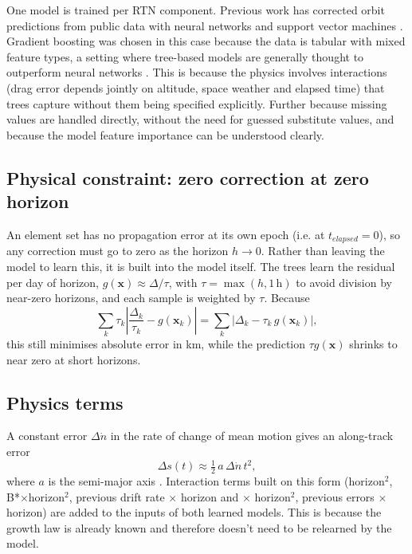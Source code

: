 \documentclass[11pt, a4paper]{article}
\begin{document}
One model is trained per RTN component. Previous work has corrected orbit predictions from public data with neural networks and support vector machines \cite{peng2018ann,peng2020}. Gradient boosting was chosen in this case because the data is tabular with mixed feature types, a setting where tree-based models are generally thought to outperform neural networks \cite{grinsztajn2022}. This is because the physics involves interactions (drag error depends jointly on altitude, space weather and elapsed time) that trees capture without them being specified explicitly. Further because missing values are handled directly, without the need for guessed substitute values, and because the model feature importance can be understood clearly.

\subsection{Physical constraint: zero correction at zero horizon}

An element set has no propagation error at its own epoch (i.e. at $t_{elapsed}=0$), so any correction must go to zero as the horizon $h \to 0$. Rather than leaving the model to learn this, it is built into the model itself. The trees learn the residual per day of horizon, $g(\mathbf{x}) \approx \Delta/\tau$, with $\tau = \max(h, 1\,\text{h})$ to avoid division by near-zero horizons, and each sample is weighted by $\tau$. Because
\begin{equation}
\sum_k \tau_k \left| \frac{\Delta_k}{\tau_k} - g(\mathbf{x}_k) \right| = \sum_k \left| \Delta_k - \tau_k\, g(\mathbf{x}_k) \right|,
\end{equation}
this still minimises absolute error in km, while the prediction $\tau g(\mathbf{x})$ shrinks to near zero at short horizons.

\subsection{Physics terms}

A constant error $\Delta\dot{n}$ in the rate of change of mean motion gives an along-track error
\begin{equation}
\Delta s(t) \approx \tfrac{1}{2}\, a\, \Delta\dot{n}\, t^2,
\end{equation}
where $a$ is the semi-major axis \cite{vallado2013}. Interaction terms built on this form (horizon$^2$, B*$\times$horizon$^2$, previous drift rate $\times$ horizon and $\times$ horizon$^2$, previous errors $\times$ horizon) are added to the inputs of both learned models. This is because the growth law is already known and therefore doesn't need to be relearned by the model.
\end{document}
